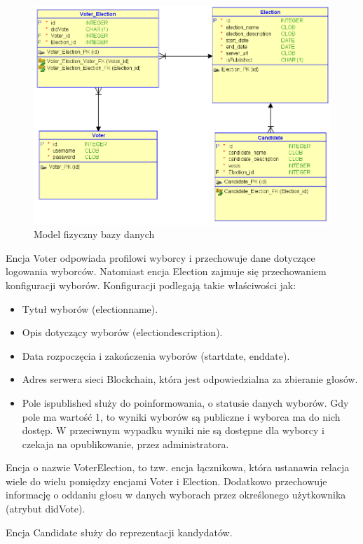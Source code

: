 \documentclass[a4paper,13pt]{report}
\begin{document}
\begin{figure}[h]
    \centering
    \includegraphics[scale=0.4]{images/Relational.png}
    \caption{Model fizyczny bazy danych}
\end{figure}

Encja Voter odpowiada profilowi wyborcy i przechowuje dane dotyczące logowania wyborców. Natomiast encja Election zajmuje się przechowaniem konfiguracji wyborów. Konfiguracji podlegają takie właściwości jak:
\begin{itemize}
	\item Tytuł wyborów (electionname).
	\item Opis dotyczący wyborów (electiondescription).
	\item Data rozpoczęcia  i zakończenia wyborów (startdate, enddate).
	\item Adres serwera sieci Blockchain, która jest odpowiedzialna za zbieranie głosów.
	\item Pole ispublished służy do poinformowania, o statusie danych wyborów. Gdy pole ma wartość 1, to wyniki wyborów są publiczne i wyborca ma do nich dostęp. W przeciwnym wypadku wyniki nie są dostępne dla wyborcy i czekaja na opublikowanie, przez administratora.
\end{itemize}

Encja o nazwie VoterElection, to tzw. encja łącznikowa, która ustanawia relacja wiele do wielu pomiędzy encjami Voter i Election. Dodatkowo przechowuje informację o oddaniu głosu w danych wyborach przez określonego użytkownika (atrybut didVote). 

Encja Candidate służy do reprezentacji kandydatów. 
\end{document}
